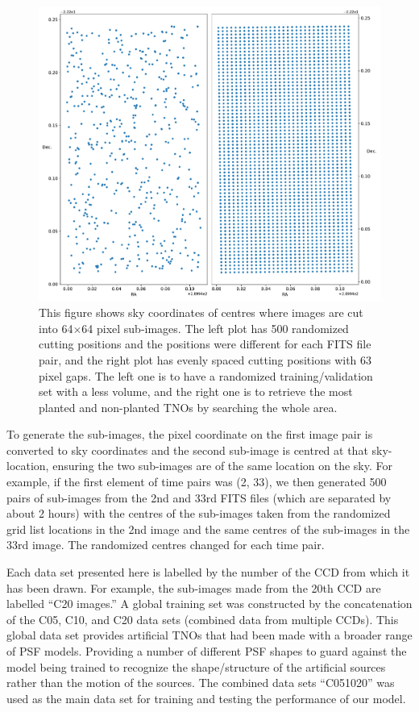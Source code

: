 \documentclass{aastex631}
\begin{document}
\begin{figure}[ht]
    \centering
    \includegraphics[width=\textwidth,keepaspectratio]{Figures/grid.pdf}
    \caption{This figure shows sky coordinates of centres where images are cut into 64$\times$64 pixel sub-images.
    The left plot has 500 randomized cutting positions and the positions were different for each FITS file pair, and the right plot has evenly spaced cutting positions with 63 pixel gaps.
    The left one is to have a randomized training/validation set with a less volume, and the right one is to retrieve the most planted and non-planted TNOs by searching the whole area.}
    \label{fig:grid}
\end{figure}

To generate the sub-images, the pixel coordinate on the first image pair is converted to sky coordinates and the second sub-image is centred at that sky-location, ensuring the two sub-images are of the same location on the sky.
For example, if the first element of time pairs was (2, 33), we then generated 500 pairs of sub-images from the 2nd and 33rd FITS files (which are separated by about 2 hours) with the centres of the sub-images taken from the randomized grid list locations in the 2nd image and the same centres of the sub-images in the 33rd image. The randomized centres changed for each time pair.

Each data set presented here is labelled by the number of the CCD from which it has been drawn.  For example, the sub-images made from the 20th CCD are labelled ``C20 images.'' 
A global training set was constructed by the concatenation of the C05, C10, and C20 data sets (combined data from multiple CCDs).  
This global data set provides artificial TNOs that had been made with a broader range of PSF models. 
Providing a number of different PSF shapes to guard against the model being trained to recognize the shape/structure of the artificial sources rather than the motion of the sources.
The combined data sets ``C051020'' was used as the main data set for training and testing the performance of our model.
\end{document}
